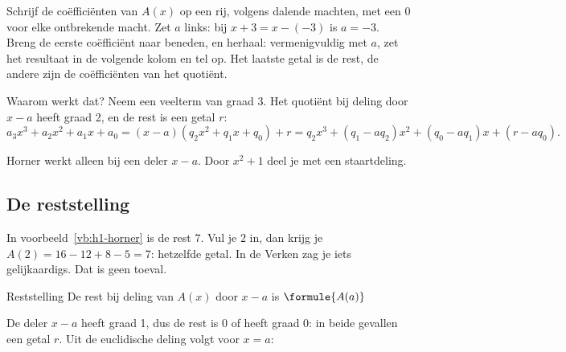 \begin{werkwijze}
Schrijf de coëfficiënten van $A(x)$ op een rij, volgens dalende machten, met een $0$ voor elke ontbrekende macht. Zet $a$ links: bij $x + 3 = x - (-3)$ is $a = -3$. Breng de eerste coëfficiënt naar beneden, en herhaal: vermenigvuldig met $a$, zet het resultaat in de volgende kolom en tel op. Het laatste getal is de rest, de andere zijn de coëfficiënten van het quotiënt.
\end{werkwijze}

Waarom werkt dat? Neem een veelterm van graad 3. Het quotiënt bij deling door $x - a$ heeft graad 2, en de rest is een getal $r$:
\[a_3x^3 + a_2x^2 + a_1x + a_0 = (x - a)(q_2x^2 + q_1x + q_0) + r = q_2x^3 + (q_1 - aq_2)x^2 + (q_0 - aq_1)x + (r - aq_0) .\]

Horner werkt alleen bij een deler $x - a$. Door $x^2 + 1$ deel je met een staartdeling.

\begin{oefeningen}
\end{oefeningen}

\subsection{De reststelling}

In voorbeeld~\ref{vb:h1-horner} is de rest $7$. Vul je $2$ in, dan krijg je $A(2) = 16 - 12 + 8 - 5 = 7$: hetzelfde getal. In de Verken zag je iets gelijkaardigs. Dat is geen toeval.

\begin{theorie}
\begin{stelling}{Reststelling}
De rest bij deling van $A(x)$ door $x - a$ is \quad $\formule{A(a)}$
\end{stelling}

\begin{bewijs}
De deler $x - a$ heeft graad 1, dus de rest is $0$ of heeft graad 0: in beide gevallen een getal $r$. Uit de euclidische deling
volgt voor $x = a$:
\end{bewijs}
\end{theorie}

